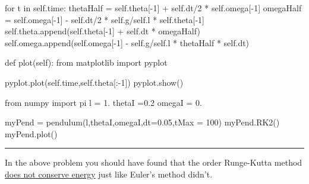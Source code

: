 \begin{enumerate}
\begin{codeexample}
\begin{VerbatimOut}{\listingFile}
        for t in self.time:
            thetaHalf = self.theta[-1] + self.dt/2 * self.omega[-1]
            omegaHalf = self.omega[-1] - self.dt/2 * self.g/self.l * self.theta[-1]
            self.theta.append(self.theta[-1] + self.dt * omegaHalf)
            self.omega.append(self.omega[-1] - self.g/self.l * thetaHalf * self.dt)


    def plot(self):
        from matplotlib import pyplot

        pyplot.plot(self.time,self.theta[:-1])
        pyplot.show()


from numpy import pi
l = 1.
thetaI =0.2
omegaI = 0.

myPend = pendulum(l,thetaI,omegaI,dt=0.05,tMax = 100)
myPend.RK2()
myPend.plot()
            \end{VerbatimOut}
\end{codeexample}
\else
\noindent\rule{4 in}{0.01 in}
\fi

\end{enumerate}

In the above problem you should have found that the 
order Runge-Kutta method  \ul{does not conserve energy} just
like Euler's method didn't.  

